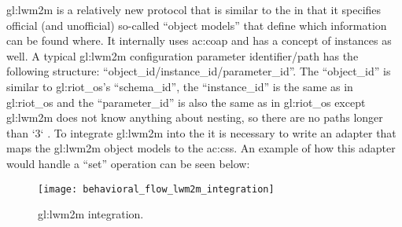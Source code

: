 \gls{gl:lwm2m} is a relatively new protocol that is similar to the  in that it specifies official (and unofficial) so-called ``object models'' that define which information can be found where.
It internally uses \gls{ac:coap} and has a concept of instances as well.
A typical \gls{gl:lwm2m} configuration parameter identifier/path has the following structure:
``object\_id/instance\_id/parameter\_id''.
The ``object\_id'' is similar to \gls{gl:riot_os}'s ``schema\_id'', the ``instance\_id'' is the same as in \gls{gl:riot_os} and the ``parameter\_id'' is also the same as in \gls{gl:riot_os} except \gls{gl:lwm2m} does not know anything about nesting, so there are no paths longer than `3` \cite{oma-lwm2m-core-12}.
To integrate \gls{gl:lwm2m} into the  it is necessary to write an adapter that maps the \gls{gl:lwm2m} object models to the  \glspl{ac:cs}.
An example of how this adapter would handle a ``set'' operation can be seen below:

\begin{figure}[H]
    \centering
    \texttt{[image: behavioral\_flow\_lwm2m\_integration]}
    \caption{\gls{gl:lwm2m} integration.}
    \label{fig:lwm2m_integration}
\end{figure}

